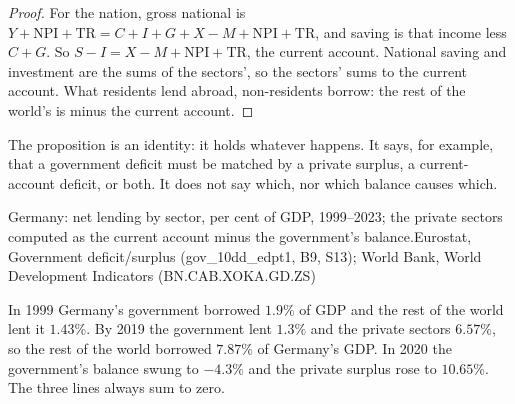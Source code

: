 \begin{proof}
For the nation, gross national  is
$Y + \mathrm{NPI} + \mathrm{TR} = C + I + G + X - M + \mathrm{NPI} + \mathrm{TR}$, and saving is that income less
$C + G$. So $S - I = X - M + \mathrm{NPI} + \mathrm{TR}$, the current account. National saving and
investment are the sums of the sectors', so the sectors'  sums
to the current account. What residents lend abroad, non-residents
borrow: the rest of the world's  is minus the current account.
\end{proof}

The proposition is an identity: it holds whatever happens. It says, for
example, that a government deficit must be matched by a private surplus,
a current-account deficit, or both. It does not say which, nor which
balance causes which.

\begin{omchart}{Germany: net lending by sector, per cent of GDP, 1999--2023;
the private sectors computed as the current account minus the
government's balance.}{Eurostat, Government deficit/surplus
(gov\_10dd\_edpt1, B9, S13); World Bank, World Development Indicators
(BN.CAB.XOKA.GD.ZS)}
\end{omchart}

In 1999 Germany's government borrowed $1.9\%$ of GDP and the rest of the world
lent it $1.43\%$. By 2019 the government lent $1.3\%$ and the private sectors
$6.57\%$, so the rest of the world borrowed $7.87\%$ of Germany's GDP. In 2020 the
government's balance swung to $-4.3\%$ and the private surplus rose to $10.65\%$.
The three lines always sum to zero.

